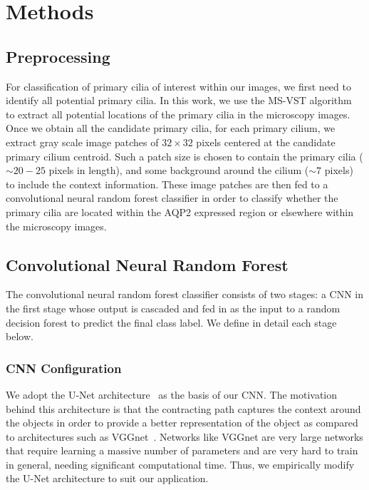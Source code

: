 \section{Methods}

\subsection{Preprocessing}

For classification of primary cilia of interest within our images, we first need to identify all potential primary cilia. In this work, we use the MS-VST algorithm~\cite{bozhang_Wavelets_2008} to extract all potential locations of the primary cilia in the microscopy images. Once we obtain all the candidate primary cilia, for each primary cilium, we extract gray scale image patches of $32 \times 32$ pixels centered at the candidate primary cilium centroid. Such a patch size is chosen to contain the primary cilia ($\sim20-25$ pixels in length), and some background around the cilium ($\sim7$ pixels) to include the context information. These image patches are then fed to a convolutional neural random forest classifier in order to classify whether the primary cilia are located within the AQP2 expressed region or elsewhere within the microscopy images.

\subsection{Convolutional Neural Random Forest}

The convolutional neural random forest classifier consists of two stages: a CNN in the first stage whose output is cascaded and fed in as the input to a random decision forest to predict the final class label. We define in detail each stage below.

\subsubsection{\textbf{CNN Configuration}}

We adopt the U-Net architecture~\cite{ronneberger_UNet_2015} as the basis of our CNN\@. The motivation behind this architecture is that the contracting path captures the context around the objects in order to provide a better representation of the object as compared to architectures such as VGGnet~\cite{simonyan_Very_2014}. Networks like VGGnet are very large networks that require learning a massive number of parameters and are very hard to train in general, needing significant computational time. Thus, we empirically modify the U-Net architecture to suit our application.

